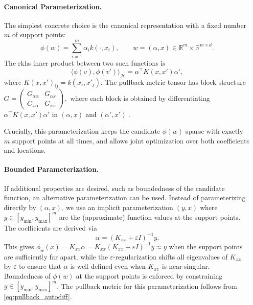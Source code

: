 \documentclass{article}
\newcommand{\R}{\mathbb{R}}
\newcommand{\Hs}{\mathcal{H}}
\newcommand{\transposed}{^\intercal}
\newcommand{\inner}[2]{\langle #1, #2 \rangle}
\newcommand{\kernelH}{k}
\begin{document}
\paragraph{Canonical Parameterization.}
The simplest concrete choice is the canonical representation with a fixed number $m$ of support points:
\begin{equation}
    \phi(w) = \sum_{i=1}^m \alpha_i \kernelH(\cdot, x_i), \qquad w = (\alpha, x) \in \R^m \times \R^{m \times d}.
\end{equation}
The \gls{rkhs} inner product between two such functions is
\begin{equation}
    \inner{\phi(v)}{\phi(v')}_\Hs = \alpha\transposed K(x, x') \alpha',
\end{equation}
where $K(x, x')_{ij} = \kernelH(x_i, x'_j)$. The pullback metric tensor has block structure
$
    G = \begin{pmatrix} G_{\alpha\alpha} & G_{\alpha x} \\ G_{x\alpha} & G_{xx} \end{pmatrix},
$
where each block is obtained by differentiating $\alpha\transposed K(x, x') \alpha'$ in $(\alpha, x)$ and $(\alpha', x')$ . 

Crucially, this parameterization keeps the candidate $\phi(w)$ sparse with exactly $m$ support points at all times, and allows joint optimization over both coefficients and locations.

\paragraph{Bounded Parameterization.}
If additional properties are desired, such as boundedness of the candidate function, an alternative parameterization can be used. Instead of parameterizing directly by $(\alpha, x)$, we use an implicit parameterization $(y, x)$ where $y \in [y_{\min}, y_{\max}]^m$ are the (approximate) function values at the support points. The coefficients are derived via
\begin{equation}
    \alpha = (K_{xx} + \varepsilon I)^{-1} y.
\end{equation}
This gives $\phi_w(x) = K_{xx}\alpha = K_{xx}(K_{xx} + \varepsilon I)^{-1} y \approx y$ when the support points are sufficiently far apart, while the $\varepsilon$-regularization shifts all eigenvalues of $K_{xx}$ by $\varepsilon$ to ensure that $\alpha$ is well defined even when $K_{xx}$ is near-singular. Boundedness of $\phi(w)$ at the support points is enforced by constraining $y \in [y_{\min}, y_{\max}]^m$. The pullback metric for this parameterization follows from \cref{eq:pullback_autodiff}.
\end{document}
